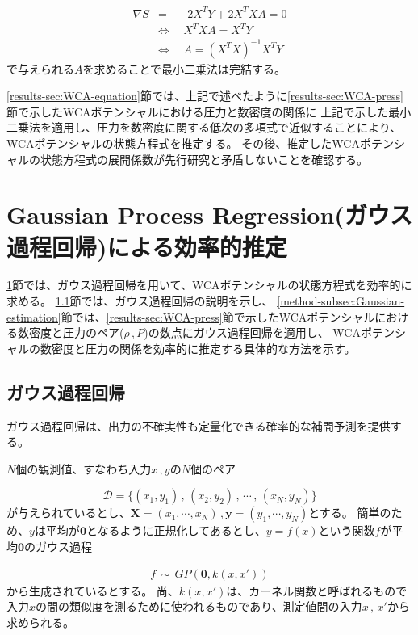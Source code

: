 \documentclass[titlepage]{jsreport}
\begin{document}
{{{\large
\begin{eqnarray}
    {\nabla}S&=&-2X^TY+2X^TXA=0\nonumber\\
    &{\Leftrightarrow}&{\ }{\ }X^TXA=X^TY\nonumber\\
    &{\Leftrightarrow}&{\ }{\ }A=(X^TX)^{-1}X^TY\label{eq:normal-equation}
\end{eqnarray}
\normalsize
で与えられる$A$を求めることで最小二乗法は完結する\cite{least-squares}。

\ref{results-sec:WCA-equation}節では、上記で述べたように\ref{results-sec:WCA-press}節で示したWCAポテンシャルにおける圧力と数密度の関係に
上記で示した最小二乗法を適用し、圧力を数密度に関する低次の多項式で近似することにより、WCAポテンシャルの状態方程式を推定する。
その後、推定したWCAポテンシャルの状態方程式の展開係数が先行研究と矛盾しないことを確認する。


\section{Gaussian Process Regression(ガウス過程回帰)による効率的推定}\label{method-sec:Gauss}
\ref{method-sec:Gauss}節では、ガウス過程回帰を用いて、WCAポテンシャルの状態方程式を効率的に求める。
\ref{method-subsec:Gauss}節では、ガウス過程回帰の説明を示し、
\ref{method-subsec:Gaussian-estimation}節では、\ref{results-sec:WCA-press}節で示したWCAポテンシャルにおける数密度と圧力のペア($\rho$\,,\,$P$)の数点にガウス過程回帰を適用し、
WCAポテンシャルの数密度と圧力の関係を効率的に推定する具体的な方法を示す。


\subsection{ガウス過程回帰}\label{method-subsec:Gauss}
ガウス過程回帰は、出力の不確実性も定量化できる確率的な補間予測を提供する\cite{machine-learning}。


$N$個の観測値、すなわち入力$x$\,,\,$y$の$N$個のペア

\large
\[
    \mathcal{D}=\{(x_1,y_1)\,,\,(x_2,y_2)\,,\,\cdots\,,\,(x_N,y_N)\}
\]
\normalsize
が与えられているとし、$\bm{X}=(x_1,\cdots,x_N)$\,,\,$\bm{y}=(y_1,\cdots,y_N)$とする。
簡単のため、$y$は平均が$\bm{0}$となるように正規化してあるとし、$y=f(x)$という関数$f$が平均$\bm{0}$のガウス過程

\large
\begin{eqnarray}
    f\,{\sim}\,GP(\bm{0},k(x,x'))\nonumber
\end{eqnarray}
\normalsize
から生成されているとする。
尚、$k(x,x')$は、カーネル関数と呼ばれるもので入力$x$の間の類似度を測るために使われるものであり\cite{Gauss-machine-learning}、測定値間の入力$x\,,\,x'$から求められる。

}}}
\end{document}
